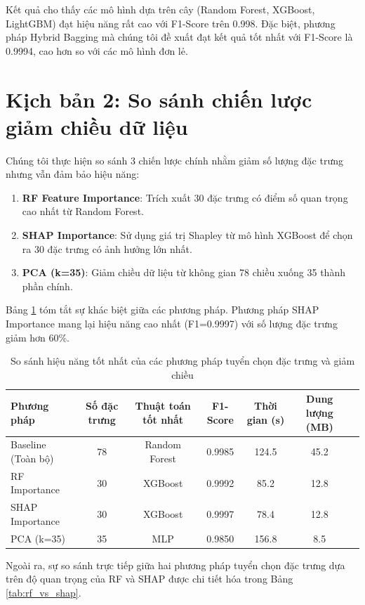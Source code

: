 Kết quả cho thấy các mô hình dựa trên cây (Random Forest, XGBoost, LightGBM) đạt hiệu năng rất cao với F1-Score trên 0.998. Đặc biệt, phương pháp Hybrid Bagging mà chúng tôi đề xuất đạt kết quả tốt nhất với F1-Score là 0.9994, cao hơn so với các mô hình đơn lẻ.

\section{Kịch bản 2: So sánh chiến lược giảm chiều dữ liệu}
Chúng tôi thực hiện so sánh 3 chiến lược chính nhằm giảm số lượng đặc trưng nhưng vẫn đảm bảo hiệu năng:
\begin{enumerate}
    \item \textbf{RF Feature Importance}: Trích xuất 30 đặc trưng có điểm số quan trọng cao nhất từ Random Forest.
    \item \textbf{SHAP Importance}: Sử dụng giá trị Shapley từ mô hình XGBoost để chọn ra 30 đặc trưng có ảnh hưởng lớn nhất.
    \item \textbf{PCA (k=35)}: Giảm chiều dữ liệu từ không gian 78 chiều xuống 35 thành phần chính.
\end{enumerate}

Bảng \ref{tab:summary_comparison} tóm tắt sự khác biệt giữa các phương pháp. Phương pháp SHAP Importance mang lại hiệu năng cao nhất (F1=0.9997) với số lượng đặc trưng giảm hơn 60\%.

\begin{table}[htbp]
\centering
\caption{So sánh hiệu năng tốt nhất của các phương pháp tuyển chọn đặc trưng và giảm chiều}
\label{tab:summary_comparison}
\begin{tabular*}{\textwidth}{@{\extracolsep{\fill}}lcccccc@{}}
\toprule
\textbf{Phương pháp} & \textbf{Số đặc trưng} & \textbf{Thuật toán tốt nhất} & \textbf{F1-Score} & \textbf{Thời gian (s)} & \textbf{Dung lượng (MB)} \\ \midrule
Baseline (Toàn bộ) & 78 & Random Forest & 0.9985 & 124.5 & 45.2 \\
RF Importance & 30 & XGBoost & 0.9992 & 85.2 & 12.8 \\
SHAP Importance & 30 & XGBoost & 0.9997 & 78.4 & 12.8 \\
PCA (k=35) & 35 & MLP & 0.9850 & 156.8 & 8.5 \\ \bottomrule
\end{tabular*}
\end{table}

Ngoài ra, sự so sánh trực tiếp giữa hai phương pháp tuyển chọn đặc trưng dựa trên độ quan trọng của RF và SHAP được chi tiết hóa trong Bảng \ref{tab:rf_vs_shap}.

